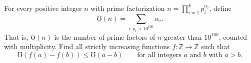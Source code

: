 For every positive integer $n$ with prime factorization $n = \prod_{i=1}^{k} p_i^{\alpha_i}$, define
\[
\mho(n) = \sum_{i \colon p_i > 10^{100}} \alpha_i.
\]
That is, $\mho(n)$ is the number of prime factors of $n$ greater than $10^{100}$, counted with multiplicity. Find all strictly increasing functions $f \colon \mathbb{Z} \to \mathbb{Z}$ such that
\[
\mho\!\left(f(a) - f(b)\right) \leq \mho(a - b) \qquad \text{for all integers } a \text{ and } b \text{ with } a > b.
\]
